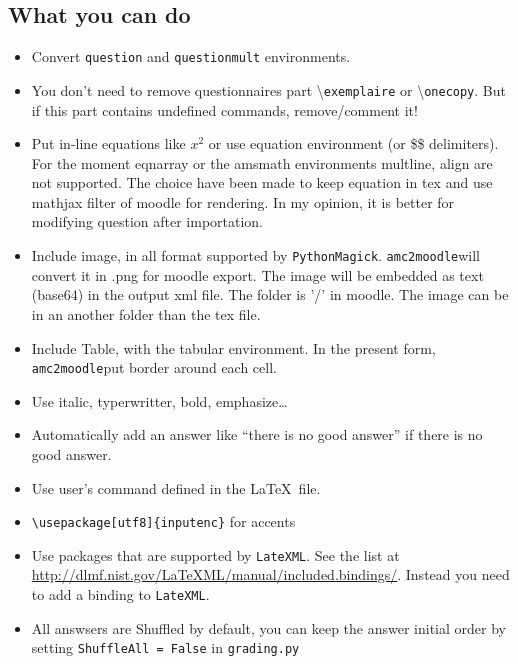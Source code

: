 \documentclass[a4paper]{article}
\newcommand{\amc}{\texttt{amc2moodle}}
\begin{document}
\subsection{What you can do}
\begin{itemize}
\item Convert \texttt{question} and \texttt{questionmult} environments.
\item You don't need to remove questionnaires part \textbackslash \texttt{exemplaire} or \textbackslash \texttt{onecopy}. But if this part contains undefined commands, remove/comment it!
\item Put in-line equations like $x^2$ or use equation environment (or \$\$ delimiters). For the moment eqnarray  or the amsmath environments multline, align are not supported. The choice have been made to keep equation in tex and use mathjax filter of moodle for rendering. In my opinion, it is better for modifying question after importation.
\item Include image, in all format supported by \texttt{PythonMagick}. \amc   will convert it in .png for moodle export. The image will be embedded as text (base64) in the output xml file. The folder is '/' in moodle. The image can be in an another folder than the tex file.
\item Include Table, with the tabular environment. In the present form, \amc put  border around each cell.
\item Use italic, typerwritter, bold, emphasize\dots
\item Automatically add an answer like ``there is no good answer'' if there is no good answer.
\item Use user's command defined in the \LaTeX~file.
\item \texttt{\textbackslash usepackage[utf8]\{inputenc\}}   for accents
\item Use packages that are supported by \texttt{LateXML}. See the list at \url{http://dlmf.nist.gov/LaTeXML/manual/included.bindings/}. Instead you need to add a binding to \texttt{LateXML}.
\item All answsers are Shuffled by default, you can keep the answer initial order by setting \texttt{ShuffleAll = False} in \texttt{grading.py}
\end{itemize}
\end{document}
